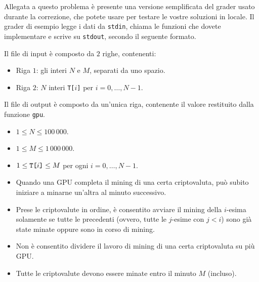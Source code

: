 \Grader
Allegata a questo problema è presente una versione semplificata del grader usato durante la correzione, che potete usare per testare le vostre soluzioni in locale. Il grader di esempio legge i dati da \texttt{stdin}, chiama le funzioni che dovete implementare e scrive su \texttt{stdout}, secondo il seguente formato.

Il file di input è composto da $2$ righe, contenenti:
\begin{itemize}[nolistsep,itemsep=2mm]
\item Riga $1$: gli interi $N$ e $M$, separati da uno spazio.
\item Riga $2$: $N$ interi \texttt{T[$i$]} per $i = 0,\ldots, N-1$.
\end{itemize}

Il file di output è composto da un'unica riga, contenente il valore restituito dalla funzione \texttt{gpu}.


\Constraints

\begin{itemize}[nolistsep, itemsep=2mm]
	\item $1 \le N \le 100\,000$.
    \item $1 \le M \le 1\,000\,000$.
	\item $1 \le \text{\texttt{T[$i$]}} \le M$ per ogni $i=0,\ldots, N-1$.
    \item Quando una GPU completa il mining di una certa criptovaluta, può subito iniziare a minarne un'altra al minuto successivo.
    \item Prese le criptovalute in ordine, è consentito avviare il mining della $i$-esima solamente se tutte le precedenti (ovvero, tutte le $j$-esime con $j < i$) sono già state minate oppure sono in corso di mining.
    \item Non è consentito dividere il lavoro di mining di una certa criptovaluta su più GPU.
    \item Tutte le criptovalute devono essere minate entro il minuto $M$ (incluso).
\end{itemize}



\Scoring

